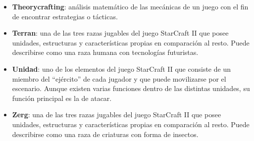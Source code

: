 {\begin{itemize}
\item \textbf{Theorycrafting}: análisis matemático de las mecánicas de un juego con el fin de encontrar estrategias o tácticas. 
\item \textbf{Terran}: una de las tres razas jugables del juego StarCraft II que posee unidades, estructuras y características propias en comparación al resto. Puede describirse como una raza humana con tecnologías futuristas. 
\item \textbf{Unidad}: uno de los elementos del juego StarCraft II que consiste de un miembro del “ejército” de cada jugador y que puede movilizarse por el escenario. Aunque existen varias funciones dentro de las distintas unidades, su función principal es la de atacar. 
\item \textbf{Zerg}: una de las tres razas jugables del juego StarCraft II que posee unidades, estructuras y características propias en comparación al resto. Puede describirse como una raza de criaturas con forma de insectos.
\end{itemize}
}